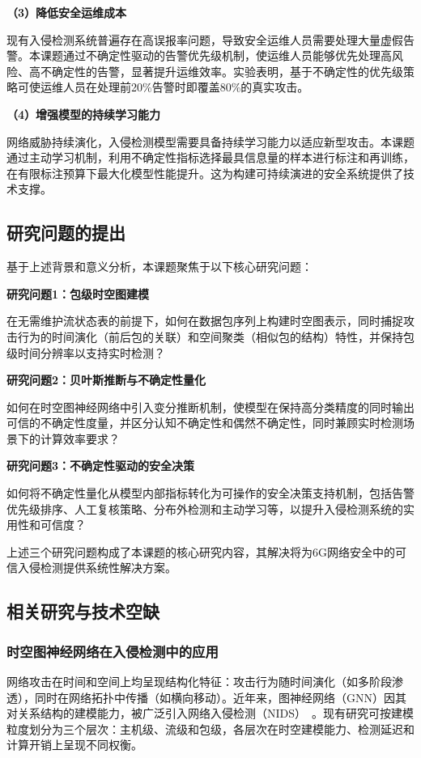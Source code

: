 \textbf{（3）降低安全运维成本}

现有入侵检测系统普遍存在高误报率问题，导致安全运维人员需要处理大量虚假告警。本课题通过不确定性驱动的告警优先级机制，使运维人员能够优先处理高风险、高不确定性的告警，显著提升运维效率。实验表明，基于不确定性的优先级策略可使运维人员在处理前20\%告警时即覆盖80\%的真实攻击。

\textbf{（4）增强模型的持续学习能力}

网络威胁持续演化，入侵检测模型需要具备持续学习能力以适应新型攻击。本课题通过主动学习机制，利用不确定性指标选择最具信息量的样本进行标注和再训练，在有限标注预算下最大化模型性能提升。这为构建可持续演进的安全系统提供了技术支撑。

\subsection{研究问题的提出}

基于上述背景和意义分析，本课题聚焦于以下核心研究问题：

\textbf{研究问题1：包级时空图建模}

在无需维护流状态表的前提下，如何在数据包序列上构建时空图表示，同时捕捉攻击行为的时间演化（前后包的关联）和空间聚类（相似包的结构）特性，并保持包级时间分辨率以支持实时检测？

\textbf{研究问题2：贝叶斯推断与不确定性量化}

如何在时空图神经网络中引入变分推断机制，使模型在保持高分类精度的同时输出可信的不确定性度量，并区分认知不确定性和偶然不确定性，同时兼顾实时检测场景下的计算效率要求？

\textbf{研究问题3：不确定性驱动的安全决策}

如何将不确定性量化从模型内部指标转化为可操作的安全决策支持机制，包括告警优先级排序、人工复核策略、分布外检测和主动学习等，以提升入侵检测系统的实用性和可信度？

上述三个研究问题构成了本课题的核心研究内容，其解决将为6G网络安全中的可信入侵检测提供系统性解决方案。



\subsection{相关研究与技术空缺}

\subsubsection{时空图神经网络在入侵检测中的应用}

网络攻击在时间和空间上均呈现结构化特征：攻击行为随时间演化（如多阶段渗透），同时在网络拓扑中传播（如横向移动）。近年来，图神经网络（GNN）因其对关系结构的建模能力，被广泛引入网络入侵检测（NIDS）~\cite{lo2022egraphsage,E-ResGAT,wang2025bsgat}。现有研究可按建模粒度划分为三个层次：主机级、流级和包级，各层次在时空建模能力、检测延迟和计算开销上呈现不同权衡。

